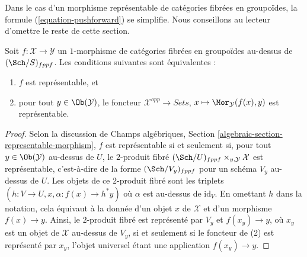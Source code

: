 \noindent
Dans le cas d'un morphisme représentable de catégories fibrées en groupoïdes,
la formule (\ref{equation-pushforward}) se simplifie. Nous conseillons au
lecteur d'omettre le reste de cette section.

\begin{lemma}
\label{lemma-representable}
Soit $f : \mathcal{X} \to \mathcal{Y}$ un $1$-morphisme de catégories
fibrées en groupoïdes au-dessus de $(\Sch/S)_{fppf}$. Les conditions suivantes sont
équivalentes :
\begin{enumerate}
\item $f$ est représentable, et
\item pour tout $y \in \Ob(\mathcal{Y})$, le foncteur
$\mathcal{X}^{opp} \to \textit{Sets}$,
$x \mapsto \Mor_\mathcal{Y}(f(x), y)$
est représentable.
\end{enumerate}
\end{lemma}

\begin{proof}
Selon la discussion de
Champs algébriques, Section \ref{algebraic-section-representable-morphism},
$f$ est représentable si et seulement si, pour tout
$y \in \Ob(\mathcal{Y})$
au-dessus de $U$, le $2$-produit fibré
$(\Sch/U)_{fppf} \times_{y, \mathcal{Y}} \mathcal{X}$
est représentable, c'est-à-dire de la forme $(\Sch/V_y)_{fppf}$ pour un
schéma $V_y$ au-dessus de $U$. Les objets de ce $2$-produit fibré sont les triplets
$(h : V \to U, x, \alpha : f(x) \to h^*y)$ où $\alpha$ est
au-dessus de $\text{id}_V$. En omettant $h$ dans la notation, cela
équivaut à la donnée d'un objet $x$ de $\mathcal{X}$ et d'un
morphisme $f(x) \to y$. Ainsi, le $2$-produit fibré est
représenté par $V_y$ et $f(x_y) \to y$, où $x_y$ est un objet
de $\mathcal{X}$ au-dessus de $V_y$, si et seulement si le foncteur de (2) est représenté
par $x_y$, l'objet universel étant une application $f(x_y) \to y$.
\end{proof}

